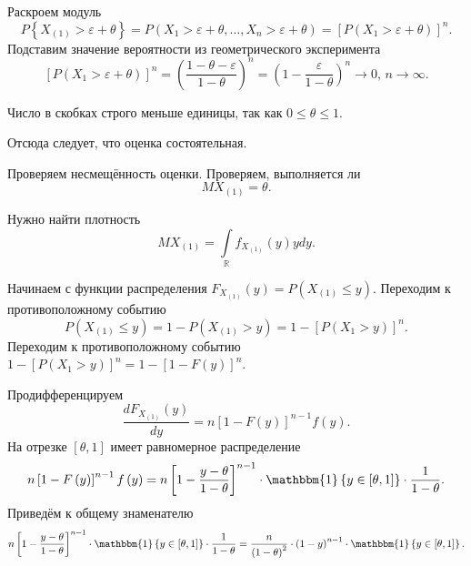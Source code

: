 Раскроем модуль
$$P \left\{ X_{ \left( 1 \right) } > \varepsilon + \theta \right\} =
  P \left( X_1 > \varepsilon + \theta, \dotsc, X_n > \varepsilon + \theta \right) =
  \left[ P \left( X_1 > \varepsilon + \theta \right) \right]^n.$$
Подставим значение вероятности из геометрического эксперимента
$$ \left[ P \left( X_1 > \varepsilon + \theta \right) \right]^n =
  \left( \frac{1 - \theta - \varepsilon }{1 - \theta } \right)^n =
  \left( 1 - \frac{ \varepsilon }{1 - \theta } \right)^n \to
  0, \,
  n \to \infty.$$

Число в скобках строго меньше единицы, так как $0 \leq \theta \leq 1$.

Отсюда следует, что оценка состоятельная.

Проверяем несмещённость оценки.
Проверяем, выполняется ли
$$MX_{ \left( 1 \right) } =
  \theta.$$

Нужно найти плотность
$$MX_{ \left( 1 \right) } =
  \int \limits_{ \mathbb{R}} f_{X_{ \left( 1 \right) }} \left( y \right) ydy.$$

Начинаем с функции распределения
$F_{X_{ \left( 1 \right) }} \left( y \right) =
  P \left( X_{ \left( 1 \right) } \leq y \right) $.
Переходим к противоположному событию
$$P \left( X_{ \left( 1 \right) } \leq y \right) =
  1 - P \left( X_{ \left( 1 \right) } > y \right) =
  1 - \left[ P \left( X_1 > y \right) \right]^n.$$
Переходим к противоположному событию
$1 - \left[ P \left( X_1 > y \right) \right]^n =
  1 - \left[ 1 - F \left( y \right) \right]^n$.

Продифференцируем
$$ \frac{dF_{X_{ \left( 1 \right) }} \left( y \right) }{dy} =
  n \left[ 1 - F \left( y \right) \right]^{n - 1} f \left( y \right).$$
На отрезке $ \left[ \theta, 1 \right] $ имеет равномерное распределение
$$n \left[ 1 - F \left( y \right) \right]^{n - 1} f \left( y \right) =
  n \left[ 1 - \frac{y - \theta }{1 - \theta } \right]^{n - 1} \cdot
  \mathbbm{1} \left\{ y \in \left[ \theta, 1 \right] \right\} \cdot \frac{1}{1 - \theta }.$$
Приведём к общему знаменателю
$$n \left[ 1 - \frac{y - \theta }{1 - \theta } \right]^{n - 1} \cdot
  \mathbbm{1} \left\{ y \in \left[ \theta, 1 \right] \right\} \cdot \frac{1}{1 - \theta } =
  \frac{n}{ \left( 1 - \theta \right)^2} \cdot \left( 1 - y \right)^{n - 1} \cdot
  \mathbbm{1} \left\{ y \in \left[ \theta, 1 \right] \right\}.$$

